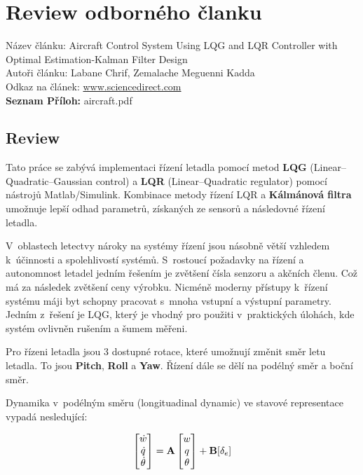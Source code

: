 \documentclass[../report.tex]{subfiles}
\begin{document}

\section{Review odborného članku}

Název článku: Aircraft Control System Using LQG and LQR Controller with Optimal
Estimation-Kalman Filter Design \\
Autoři článku: Labane Chrif, Zemalache Meguenni Kadda \\
Odkaz na článek:
\href{https://www.sciencedirect.com/science/article/pii/S1877705814011771}{www.sciencedirect.com} \\
\textbf{Seznam Příloh:} aircraft.pdf 

\subsection{Review}

Tato práce se zabývá implementaci řízení letadla pomocí metod \textbf{LQG}
(Linear–Quadratic–Gaussian control) a \textbf{LQR} (Linear–Quadratic regulator) pomocí
nástrojů Matlab/Simulink. Kombinace metody řízení LQR a \textbf{Kálmánová
filtra} umožnuje
lepší odhad parametrů, získaných ze sensorů a následovné řízení letadla.



V oblastech letectvy nároky na systémy řízení jsou násobně větší vzhledem
k účinnosti a spolehlivostí systémů. S rostoucí požadavky na řízení a
autonomnost letadel jedním řešením je zvětšení čísla senzoru a akčních členu.
Což má za následek zvětšení ceny výrobku. Nicméně moderny přístupy k řízení
systému máji byt schopny pracovat s mnoha vstupní a výstupní parametry. Jedním
z řešení je LQG, který je vhodný pro použiti v praktických úlohách, kde systém
ovlivněn rušením a šumem měřeni.


Pro řízeni letadla jsou 3 dostupné rotace, které umožnují změnit směr letu
letadla. To jsou \textbf{Pitch}, \textbf{Roll} a \textbf{Yaw}. Řízení dále se dělí na podélný směr a boční
směr.


Dynamika v podélným směru (longituadinal dynamic) ve stavové representace vypadá
nesledující:

\begin{equation}
    \begin{bmatrix}
        \dot{w} \\
        \dot{q} \\
        \dot{\theta} 
    \end{bmatrix} 
    = \textbf{A}   
    \begin{bmatrix}
        w \\
        q \\
        \theta 
    \end{bmatrix} 
    + \textbf{B} [\delta_e] \\
\end{equation}
\end{document}
